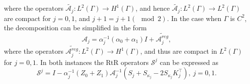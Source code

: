 \documentclass[11pt]{article}
\numberwithin{equation}{section}
\begin{document}
where the operators $\widetilde{\mathcal{A}_j}:L^2(\Gamma)\to H^1(\Gamma)$, and hence $\widetilde{\mathcal{A}_j}:L^2(\Gamma)\to L^2(\Gamma)$ are compact for $j=0,1$, and $j+1=j+1 (\!\!\!\mod 2)$. In the case when $\Gamma$ is $C^2$, the decomposition can be simplified in the form
\begin{equation}\label{eq:A_compS}
  \mathcal{A}_j=\alpha_j^{-1}(\alpha_0+\alpha_1)I+\widetilde{\mathcal{A}_j^{reg}},
\end{equation}
where the operators $\widetilde{\mathcal{A}_j^{reg}}:L^2(\Gamma)\to H^1(\Gamma)$, and thus are compact in $L^2(\Gamma)$ for $j=0,1$. In both instances the RtR operators $\mathcal{S}^j$ can be expressed as
\begin{equation}\label{eq:SjBI}
  \mathcal{S}^j=I-\alpha_j^{-1}(Z_0+Z_1)\mathcal{A}_j^{-1}(S_j+S_{\kappa_j}-2S_{\kappa_j} K_j^\top),\ j=0,1.
\end{equation}
\end{document}
